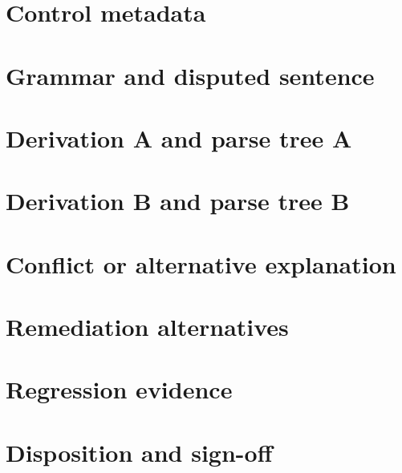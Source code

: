 \documentclass[11pt,letterpaper]{article}
\begin{document}
\makedoctitle\makedocsummary
\section{Control metadata}
\section{Grammar and disputed sentence}
\section{Derivation A and parse tree A}
\section{Derivation B and parse tree B}
\section{Conflict or alternative explanation}
\section{Remediation alternatives}
\section{Regression evidence}
\section{Disposition and sign-off}
\end{document}
